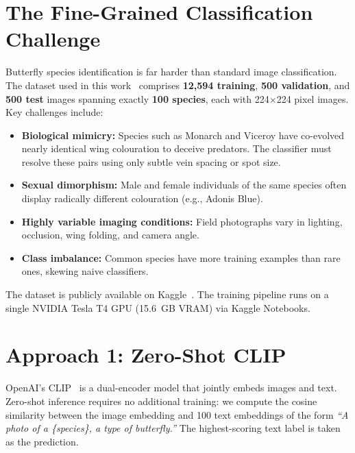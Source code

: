 \documentclass[journal, twocolumn]{IEEEtran}
\begin{document}
\begin{abstract}
Furthermore, Grad-CAM visualizations demonstrate that the model primarily focuses on biologically meaningful wing venation and pattern structures rather than background habitat information. A UMAP-based feature space analysis also reveals compact and well-separated clusters for individual butterfly species, indicating strong discriminative representation learning.

\end{abstract}

\section{The Fine-Grained Classification Challenge}

Butterfly species identification is far harder than standard image classification. The dataset used in this work~\cite{gpiosenka} comprises \textbf{12,594 training}, \textbf{500 validation}, and \textbf{500 test} images spanning exactly \textbf{100 species}, each with 224$\times$224 pixel images. Key challenges include:

\begin{itemize}
    \item \textbf{Biological mimicry:} Species such as Monarch and Viceroy have co-evolved nearly identical wing colouration to deceive predators. The classifier must resolve these pairs using only subtle vein spacing or spot size.
    \item \textbf{Sexual dimorphism:} Male and female individuals of the same species often display radically different colouration (e.g., Adonis Blue).
    \item \textbf{Highly variable imaging conditions:} Field photographs vary in lighting, occlusion, wing folding, and camera angle.
    \item \textbf{Class imbalance:} Common species have more training examples than rare ones, skewing naive classifiers.
\end{itemize}

The dataset is publicly available on Kaggle~\cite{gpiosenka}. The training pipeline runs on a single NVIDIA Tesla T4 GPU (15.6~GB VRAM) via Kaggle Notebooks.

\section{Approach 1: Zero-Shot CLIP}

OpenAI's CLIP~\cite{radford2021learning} is a dual-encoder model that jointly embeds images and text. Zero-shot inference requires no additional training: we compute the cosine similarity between the image embedding and 100 text embeddings of the form \emph{``A photo of a \{species\}, a type of butterfly.''} The highest-scoring text label is taken as the prediction.
\end{document}
